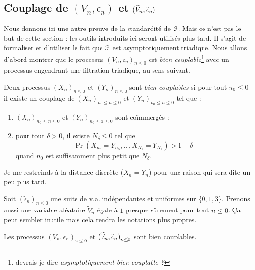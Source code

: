 \documentclass[12pt,a4paper]{article}
\begin{document}
\subsection{Couplage de $(V_n,\epsilon_n)$ et $(\widetilde{V}_n, \widetilde{\epsilon}_n)$}

Nous donnons ici une autre preuve de la standardité de $\EuScript{F}$. 
Mais ce n'est pas le but de cette section : 
les outils introduits ici seront utilisés plus tard.  
Il s'agit de formaliser et d'utiliser le fait que $\EuScript{F}$ est asymptotiquement 
triadique. 
Nous allons d'abord montrer que le processus ${(V_n, \epsilon_n)}_{n \leq 0}$ 
est \emph{bien couplable}\footnote{devrais-je dire \emph{asymptotiquement bien couplable ?}} 
avec un processus engendrant une filtration triadique, 
au sens suivant.

\begin{definition}
Deux processus  ${(X_n)}_{n \leq 0}$ et ${(Y_n)}_{n \leq 0}$ sont \emph{bien couplables}  
si pour tout $n_0 \leq 0$ il existe un couplage de 
${(X_n)}_{n_0 \leq n \leq 0}$ et ${(Y_n)}_{n_0 \leq n \leq 0}$ tel que :
\begin{enumerate}
\item ${(X_n)}_{n_0 \leq n \leq 0}$ et ${(Y_n)}_{n_0 \leq n \leq 0}$ 
sont co\"immergés ; 

\item  pour tout $\delta >0$, il existe $N_\delta \leq 0$ tel que   
$$
\Pr(X_{n_0}=Y_{n_0}, \ldots, X_{N_\delta}=Y_{N_\delta}) > 1-\delta 
$$
quand $n_0$ est suffisamment plus petit que $N_\delta$.
\end{enumerate} 
\end{definition}

\begin{remarque}
Je me restreinds à la distance discrète ($X_n=Y_n$) pour une raison qui sera 
dite un peu plus tard.
\end{remarque}

Soit ${(\widetilde{\epsilon}_n)}_{n \leq 0}$ une suite de v.a. indépendantes 
et uniformes sur $\{0,1,3\}$. 
 Prenons aussi une variable aléatoire $\widetilde{V}_n$ égale à $1$ 
presque sûrement pour tout $n \leq 0$. Ça peut sembler inutile mais 
cela rendra les notations plus propres. 

\begin{lemme}\label{lemme:joining_epsilon}
Les processus 
${(V_n, \epsilon_n)}_{n \leq 0}$ et 
 ${(\widetilde{V}_n, \widetilde{\epsilon}_n)}_{n \leq 0}$ sont bien couplables. 
\end{lemme}
\end{document}
